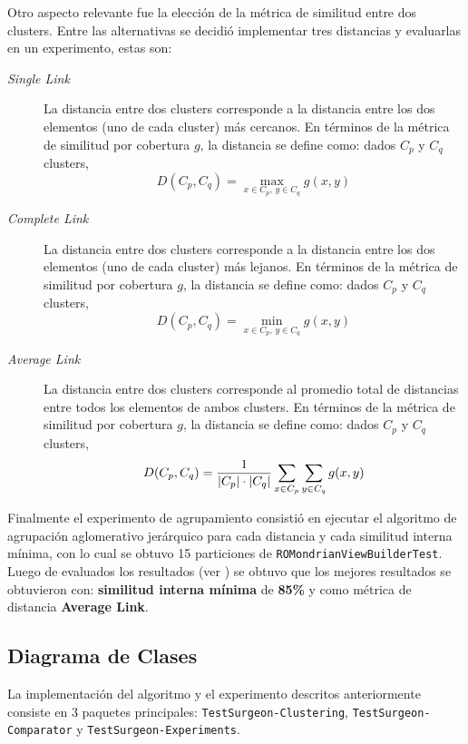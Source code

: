 \par Otro aspecto relevante fue la elección de la métrica de similitud entre dos clusters. Entre las alternativas se decidió implementar tres distancias y evaluarlas en un experimento, estas son: 
\begin{description}
\item[\emph{Single Link}] La distancia entre dos clusters corresponde a la distancia entre los dos elementos (uno de cada cluster) más cercanos. En términos de la métrica de similitud por cobertura $g$, la distancia se define como: dados $C_p$ y $C_q$ clusters,
\[ D(C_p,C_q) = \max_{x \in C_p,\, y  \in C_q} g(x,y) \]

\item[\emph{Complete Link}] La distancia entre dos clusters corresponde a la distancia entre los dos elementos (uno de cada cluster) más lejanos. En términos de la métrica de similitud por cobertura $g$, la distancia se define como: dados $C_p$ y $C_q$ clusters,
\[ D(C_p,C_q) = \min_{x \in C_p,\, y  \in C_q} g(x,y) \]

\item[\emph{Average Link}] La distancia entre dos clusters corresponde al promedio total de distancias entre todos los elementos de ambos clusters.  En términos de la métrica de similitud por cobertura $g$, la distancia se define como: dados $C_p$ y $C_q$ clusters,
\[ D(C_p,C_q) = \dfrac{1}{\vert C_p \vert\cdot\vert C_q \vert} \sum_{x \in C_p} \sum_{y  \in C_q} g(x,y) \]


\end{description}


\par Finalmente el experimento de agrupamiento consistió en ejecutar el algoritmo de agrupación aglomerativo jerárquico para cada distancia y cada similitud interna mínima, con lo cual se obtuvo 15 particiones de {\tt ROMondrianViewBuilderTest}. Luego de evaluados los resultados (ver ) se obtuvo que los mejores resultados se obtuvieron con: \textbf{similitud interna mínima} de \textbf{85\%} y como métrica de distancia \textbf{Average Link}.

\clearpage
\subsection{Diagrama de Clases}

\par La implementación del algoritmo y el experimento descritos anteriormente consiste en 3 paquetes principales: {\tt TestSurgeon-Clustering},  {\tt TestSurgeon-Comparator} y {\tt TestSurgeon-Experiments}. 

